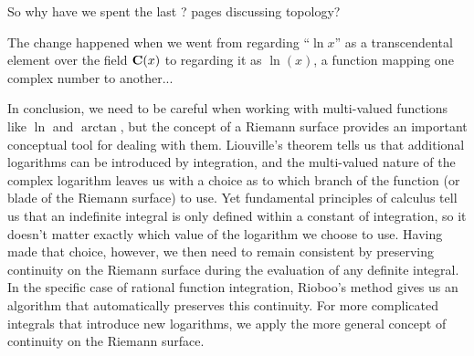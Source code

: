 So why have we spent the last ? pages discussing topology?

The change happened when we went from regarding ``$\ln x$'' as a
transcendental element over the field ${\bf C}(x)$ to regarding it as
$\ln(x)$, a function mapping one complex number to another...


In conclusion, we need to be careful when working with multi-valued
functions like $\ln$ and $\arctan$, but the concept of a Riemann
surface provides an important conceptual tool for dealing with them.
Liouville's theorem tells us that additional logarithms can be
introduced by integration, and the multi-valued nature of the complex
logarithm leaves us with a choice as to which branch of the function
(or blade of the Riemann surface) to use.  Yet fundamental principles
of calculus tell us that an indefinite integral is only defined within
a constant of integration, so it doesn't matter exactly which value of
the logarithm we choose to use.  Having made that choice, however, we
then need to remain consistent by preserving continuity on the Riemann
surface during the evaluation of any definite integral.  In the
specific case of rational function integration, Rioboo's method gives
us an algorithm that automatically preserves this continuity.  For
more complicated integrals that introduce new logarithms, we apply
the more general concept of continuity on the Riemann surface.
